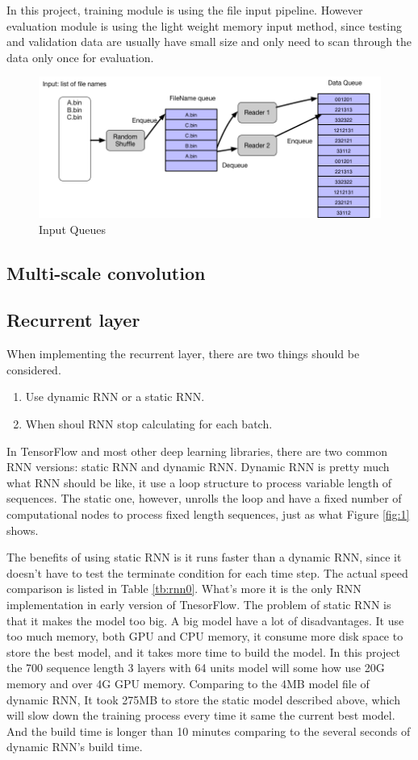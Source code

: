 In this project, training module is using the file input pipeline. However evaluation module is using the light weight memory input method, since testing and validation data are usually have small size and only need to scan through the data only once for evaluation. 

\begin{figure}[H] 
	\centering
	\includegraphics[width=5in]{Figures/input}
	\caption[Input Queues]{Input Queues}
	\label{fig:input}
\end{figure}


\subsection{Multi-scale convolution}

\subsection{Recurrent layer}
When implementing the recurrent layer, there are two things should be considered. 
\begin{enumerate}
   \item Use dynamic RNN or a static RNN.
   \item When shoul RNN stop calculating for each batch.
\end{enumerate}
In TensorFlow and most other deep learning libraries, there are two common RNN versions: static RNN and dynamic RNN. Dynamic RNN is pretty much what RNN should be like, it use a loop structure to process variable length of sequences. The static one, however, unrolls the loop and have a fixed number of computational nodes to process fixed length sequences, just as what Figure \ref{fig:1} shows. \par
The benefits of using static RNN is it runs faster than a dynamic RNN, since it doesn't have to test the terminate condition for each time step. The actual speed comparison is listed in Table \ref{tb:rnn0}. What's more it is the only RNN implementation in early version of TnesorFlow. The problem of static RNN is that it makes the model too big. A big model have a lot of disadvantages. It use too much memory, both GPU and CPU memory, it consume more disk space to store the best model, and it takes more time to build the model. In this project the 700  sequence length 3 layers with 64 units model will some how use 20G memory and over 4G GPU memory. Comparing to the 4MB model file of dynamic RNN, It took 275MB to store the static model described above, which will slow down the training process every time it same the current best model. And the build time is longer than 10 minutes comparing to the several seconds of dynamic RNN's build time.\par

